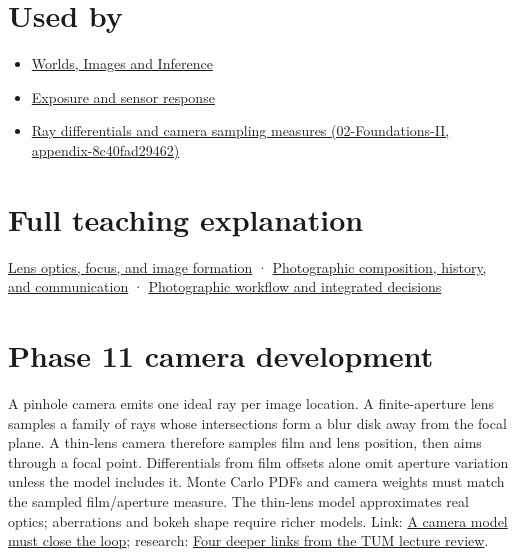 \section{Used by}\label{appendix-21f8456e2629-used-by}

\begin{itemize}
\item
  \href{Continuous\%20Notes/University\%20-\%20Worlds,\%20Images\%20and\%20Inference\%20-\%20Graphics,\%20Vision\%20and\%20Photography}{Worlds, Images and Inference}
\item
  \hyperref[appendix-92d45cdf2afc]{Exposure and sensor response}
\item
  \href{../02-Foundations-II/main.pdf\#nameddest=appendix-8c40fad29462}{Ray differentials and camera sampling measures (02-Foundations-II, appendix-8c40fad29462)}
\end{itemize}

\section{Full teaching explanation}\label{appendix-21f8456e2629-full-teaching-explanation}

\href{Continuous\%20Notes/University\%20-\%20Worlds,\%20Images\%20and\%20Inference\%20-\%20Graphics,\%20Vision\%20and\%20Photography\#Lens\%20optics,\%20focus,\%20and\%20image\%20formation}{Lens optics, focus, and image formation} · \href{Continuous\%20Notes/University\%20-\%20Worlds,\%20Images\%20and\%20Inference\%20-\%20Graphics,\%20Vision\%20and\%20Photography\#Photographic\%20composition,\%20history,\%20and\%20communication}{Photographic composition, history, and communication} · \href{Continuous\%20Notes/University\%20-\%20Worlds,\%20Images\%20and\%20Inference\%20-\%20Graphics,\%20Vision\%20and\%20Photography\#Photographic\%20workflow\%20and\%20integrated\%20decisions}{Photographic workflow and integrated decisions}

\section{Phase 11 camera development}\label{appendix-21f8456e2629-phase-11-camera-development}

A pinhole camera emits one ideal ray per image location. A finite-aperture lens samples a family of rays whose intersections form a blur disk away from the focal plane. A thin-lens camera therefore samples film and lens position, then aims through a focal point. Differentials from film offsets alone omit aperture variation unless the model includes it. Monte Carlo PDFs and camera weights must match the sampled film/aperture measure. The thin-lens model approximates real optics; aberrations and bokeh shape require richer models. Link: \href{Continuous\%20Notes/Computing\%20Foundations\%20-\%20From\%20Bits\%20to\%20C++\%20and\%20Systems\%20APIs\#A\%20camera\%20model\%20must\%20close\%20the\%20loop}{A camera model must close the loop}; research: \href{Continuous\%20Notes/Computing\%20Foundations\%20-\%20From\%20Bits\%20to\%20C++\%20and\%20Systems\%20APIs\#Four\%20deeper\%20links\%20from\%20the\%20TUM\%20lecture\%20review}{Four deeper links from the TUM lecture review}.
